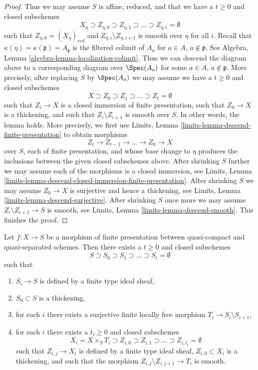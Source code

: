 \begin{proof}
\medskip\noindent
Thus we may assume $S$ is affine, reduced, and that we have a $t \geq 0$
and closed subschemes
$$
X_\eta \supset Z_{\eta, 0} \supset Z_{\eta, 1}
\supset \ldots \supset Z_{\eta, t} = \emptyset
$$
such that $Z_{\eta, 0} = (X_\eta)_{red}$ and
$Z_{\eta, i} \setminus Z_{\eta, i + 1}$
is smooth over $\eta$ for all $i$.
Recall that $\kappa(\eta) = \kappa(\mathfrak p) = A_\mathfrak p$ is
the filtered colimit of $A_a$ for $a \in A$, $a \not \in \mathfrak p$.
See Algebra, Lemma \ref{algebra-lemma-localization-colimit}.
Thus we can descend the diagram above to a corresponding diagram
over $\Spec(A_a)$ for some $a \in A$, $a \not \in \mathfrak p$.
More precisely, after replacing $S$ by $\Spec(A_a)$
we may assume we have a $t \geq 0$ and closed subschemes
$$
X \supset Z_0 \supset Z_1 \supset \ldots \supset Z_t = \emptyset
$$
such that $Z_i \to X$ is a closed immersion of finite presentation,
such that $Z_0 \to X$ is a thickening, and such that $Z_i \setminus Z_{i + 1}$
is smooth over $S$. In other words, the lemma holds.
More precisely, we first use
Limits, Lemma \ref{limits-lemma-descend-finite-presentation}
to obtain morphisms
$$
Z_t \to Z_{t - 1} \to \ldots \to Z_0 \to X
$$
over $S$, each of finite presentation, and whose
base change to $\eta$ produces the inclusions between the given
closed subschemes above. After shrinking $S$ further we may assume
each of the morphisms is a closed immersion, see
Limits, Lemma
\ref{limits-lemma-descend-closed-immersion-finite-presentation}.
After shrinking $S$ we may assume $Z_0 \to X$ is surjective
and hence a thickening, see
Limits, Lemma \ref{limits-lemma-descend-surjective}.
After shrinking $S$ once more we may assume
$Z_i \setminus Z_{i + 1} \to S$ is smooth, see
Limits, Lemma \ref{limits-lemma-descend-smooth}.
This finishes the proof.
\end{proof}

\begin{lemma}
\label{lemma-smoothness-stratification}
Let $f : X \to S$ be a morphism of finite presentation between quasi-compact
and quasi-separated schemes. Then there exists a $t \geq 0$ and closed
subschemes
$$
S \supset S_0 \supset S_1 \supset \ldots \supset S_t = \emptyset
$$
such that
\begin{enumerate}
\item $S_i \to S$ is defined by a finite type ideal sheaf,
\item $S_0 \subset S$ is a thickening,
\item for each $i$ there exists a surjective finite locally free
morphism $T_i \to S_i \setminus S_{i + 1}$,
\item for each $i$ there exists a $t_i \geq 0$ and closed subschemes
$$
X_i = X \times_S T_i \supset Z_{i, 0}
\supset Z_{i, 1} \supset \ldots \supset Z_{i, t_i} = \emptyset
$$
such that $Z_{i, j} \to X_i$ is defined by a finite type ideal sheaf,
$Z_{i, 0} \subset X_i$ is a thickening, and such that the morphism
$Z_{i, j} \setminus Z_{i, j + 1} \to T_i$ is smooth.
\end{enumerate}
\end{lemma}

